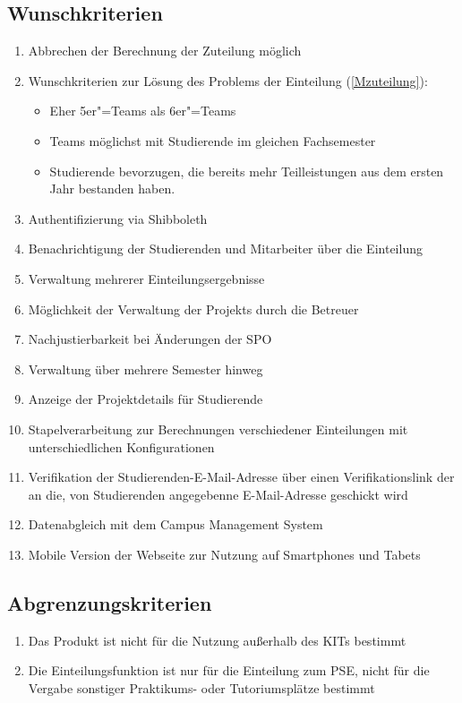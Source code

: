 \documentclass[parskip=full]{scrartcl}
\newcommand{\swtLabel}[1]{\textbf{/#1\arabic*0/}}
\begin{document}
\subsection{Wunschkriterien}
\begin{enumerate}[label=\swtLabel{W}]
  \item Abbrechen der Berechnung der Zuteilung möglich 
    
    \item Wunschkriterien zur Lösung des Problems der Einteilung (\ref{Mzuteilung}):
    \begin{itemize}
        \item Eher 5er"=Teams als 6er"=Teams
        \item Teams möglichst mit Studierende im gleichen Fachsemester 
        \item Studierende bevorzugen, die bereits mehr Teilleistungen aus dem
        ersten Jahr bestanden haben.
    \end{itemize}    
    \item Authentifizierung via Shibboleth
    \item Benachrichtigung der Studierenden und Mitarbeiter über die Einteilung
    \item Verwaltung mehrerer Einteilungsergebnisse
    \item Möglichkeit der Verwaltung der \glspl{Projekt} durch die Betreuer  %
    \item Nachjustierbarkeit bei Änderungen der SPO %
    \item Verwaltung über mehrere Semester hinweg
    \item Anzeige der Projektdetails für Studierende
    \item Stapelverarbeitung zur Berechnungen verschiedener Einteilungen mit
    unterschiedlichen Konfigurationen
    \item Verifikation der Studierenden-E-Mail-Adresse über einen
    Verifikationslink der an die, von Studierenden angegebenne E-Mail-Adresse
    geschickt wird
    \item Datenabgleich mit dem Campus Management System %
    \item Mobile Version der Webseite zur Nutzung auf Smartphones und Tabets
    
    
    
\end{enumerate}

\subsection{Abgrenzungskriterien}
\begin{enumerate}[label=\swtLabel{AG}]
 
  \item Das Produkt ist nicht für die Nutzung außerhalb des KITs bestimmt %

\item Die Einteilungsfunktion ist nur für die Einteilung zum \gls{PSE}, nicht
für die Vergabe sonstiger Praktikums- oder Tutoriumsplätze bestimmt
  
\end{enumerate}
\end{document}
